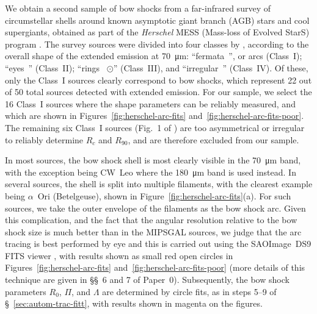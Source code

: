 We obtain a second sample of bow shocks from a far-infrared survey
\citep{Cox:2012a} of circumstellar shells around known asymptotic
giant branch (AGB) stars and cool supergiants, obtained as part of the
\textit{Herschel} MESS (Mass-loss of Evolved StarS) program
\citep{Groenewegen:2011a}.  The survey sources were divided into four
classes by \citeauthor{Cox:2012a}, according to the overall shape of
the extended emission at \SI{70}{\um}: ``fermata~\textfermata'', or
arcs (Class~I); ``eyes~\faEye'' (Class~II); ``rings~{\Large
  \(\odot\)}'' (Class~III), and ``irregular~\staveXXV'' (Class~IV).  Of
these, only the Class~I sources clearly correspond to bow shocks,
which represent 22 out of 50 total sources detected with extended
emission.  For our sample, we select the 16 Class~I sources where the
shape parameters can be reliably measured, and which are shown in
Figures~\ref{fig:herschel-arc-fits}
and~\ref{fig:herschel-arc-fits-poor}. The remaining six Class~I
sources (Fig.~1 of \citealp{Cox:2012a}) are too asymmetrical or
irregular to reliably determine \(R_{c}\) and \(R_{90}\), and are
therefore excluded from our sample.

In most sources, the bow shock shell is most clearly visible in the
\SI{70}{\um} band, with the exception being CW~Leo where the
\SI{180}{\um} band is used instead.  In several sources, the shell is
split into multiple filaments, with the clearest example being
\(\alpha\)~Ori (Betelgeuse), shown in
Figure~\ref{fig:herschel-arc-fits}(a).  For such sources, we take the
outer envelope of the filaments as the bow shock arc.  Given this
complication, and the fact that the angular resolution relative to the
bow shock size is much better than in the MIPSGAL sources, we judge
that the arc tracing is best performed by eye and this is carried out
using the SAOImage~DS9 FITS viewer \citep{Joye:2003a}, with results
shown as small red open circles in Figures~\ref{fig:herschel-arc-fits}
and~\ref{fig:herschel-arc-fits-poor} (more details of this technique
are given in \S\S~6 and 7 of Paper~0).  Subsequently, the bow shock
parameters \(R_0\), \(\Pi\), and \(\Lambda\) are determined by circle fits, as
in steps 5--9 of \S~\ref{sec:autom-trac-fitt}, with results shown in
magenta on the figures.

